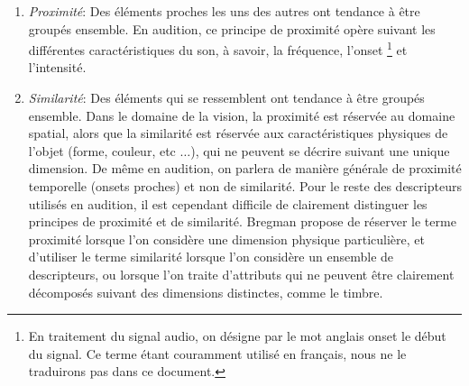 \begin{enumerate}
\item \emph{Proximité}: Des éléments proches les uns des autres ont tendance à être groupés ensemble. En audition, ce principe de proximité opère suivant les différentes caractéristiques du son, à savoir, la fréquence, l’onset \footnote{En traitement du signal audio, on désigne par le mot anglais onset le début du signal. Ce terme étant couramment utilisé en français, nous ne le traduirons pas dans ce document.} et l'intensité.
 
\item \emph{Similarité}: Des éléments qui se ressemblent ont tendance à être groupés ensemble.
Dans le domaine de la vision, la proximité est réservée au domaine spatial, alors que la similarité est réservée aux caractéristiques physiques de l'objet (forme, couleur, etc $\ldots$), qui ne peuvent se décrire suivant une unique dimension. De même en audition, on parlera de manière générale de proximité temporelle (onsets proches) et non de similarité. Pour le reste des descripteurs utilisés en audition, il est cependant difficile de clairement distinguer les principes de proximité et de similarité. Bregman propose de réserver le terme proximité lorsque l'on considère une dimension physique particulière, et d'utiliser le terme similarité lorsque l'on considère un ensemble de descripteurs, ou lorsque l'on traite d'attributs qui ne peuvent être clairement décomposés suivant des dimensions distinctes, comme le timbre. 



\end{enumerate}
